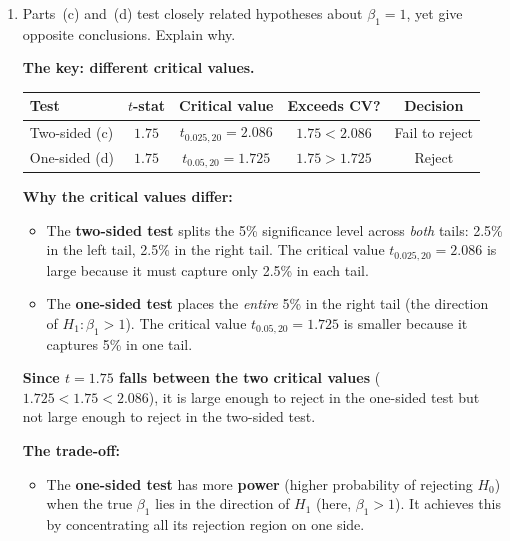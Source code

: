 \documentclass[11pt,a4paper]{article}
\begin{document}
\begin{enumerate}[label=(\alph*)]
\begin{solution}
\textbf{Step 5: Conclusion.}

At the 5\% significance level, we reject $H_0\colon \beta_1 \le 1$ in favor of $H_1\colon \beta_1 > 1$. There is statistically significant evidence that $\beta_1 > 1$.
\end{solution}

\item Parts~(c) and~(d) test closely related hypotheses about $\beta_1 = 1$, yet give opposite conclusions. Explain why.

\begin{solution}
\textbf{The key: different critical values.}

\begin{center}
\begin{tabular}{lcccc}
\toprule
\textbf{Test} & $t$-stat & \textbf{Critical value} & \textbf{Exceeds CV?} & \textbf{Decision} \\
\midrule
Two-sided (c) & $1.75$ & $t_{0.025,20} = 2.086$ & $1.75 < 2.086$ & Fail to reject \\
One-sided (d)  & $1.75$ & $t_{0.05,20} = 1.725$  & $1.75 > 1.725$ & Reject \\
\bottomrule
\end{tabular}
\end{center}

\textbf{Why the critical values differ:}
\begin{itemize}
  \item The \textbf{two-sided test} splits the 5\% significance level across \emph{both} tails: 2.5\% in the left tail, 2.5\% in the right tail. The critical value $t_{0.025,20} = 2.086$ is large because it must capture only 2.5\% in each tail.

  \item The \textbf{one-sided test} places the \emph{entire} 5\% in the right tail (the direction of $H_1\colon \beta_1 > 1$). The critical value $t_{0.05,20} = 1.725$ is smaller because it captures 5\% in one tail.
\end{itemize}

\textbf{Since $t = 1.75$ falls between the two critical values} ($1.725 < 1.75 < 2.086$), it is large enough to reject in the one-sided test but not large enough to reject in the two-sided test.

\medskip
\textbf{The trade-off:}
\begin{itemize}
  \item The \textbf{one-sided test} has more \textbf{power} (higher probability of rejecting $H_0$) when the true $\beta_1$ lies in the direction of $H_1$ (here, $\beta_1 > 1$). It achieves this by concentrating all its rejection region on one side.


\end{itemize}
\end{solution}
\end{enumerate}
\end{document}
